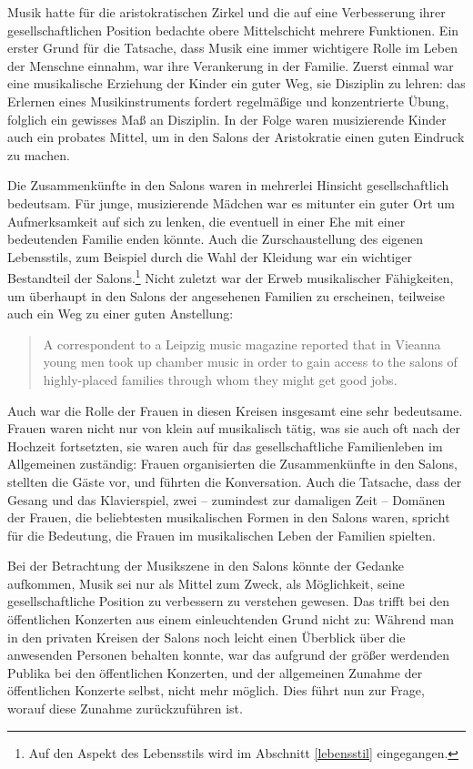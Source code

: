 \documentclass[a4paper, german, oneside]{scrbook}
\begin{document}
Musik hatte für die aristokratischen Zirkel und die auf eine Verbesserung ihrer gesellschaftlichen Position bedachte obere Mittelschicht mehrere Funktionen. Ein erster Grund für die Tatsache, dass Musik eine immer wichtigere Rolle im Leben der Menschne einnahm, war ihre Verankerung in der Familie. Zuerst einmal war eine musikalische Erziehung der Kinder ein guter Weg, sie Disziplin zu lehren: das Erlernen eines Musikinstruments fordert regelmäßige und konzentrierte Übung, folglich ein gewisses Maß an Disziplin. \parencite[vgl.][35ff.]{weber_music_2004} In der Folge waren musizierende Kinder auch ein probates Mittel, um in den Salons der Aristokratie einen guten Eindruck zu machen.

Die Zusammenkünfte in den Salons waren in mehrerlei Hinsicht gesellschaftlich bedeutsam. Für junge, musizierende Mädchen war es mitunter ein guter Ort um Aufmerksamkeit auf sich zu lenken, die eventuell in einer Ehe mit einer bedeutenden Familie enden könnte. Auch die Zurschaustellung des eigenen Lebensstils, zum Beispiel durch die Wahl der Kleidung war ein wichtiger Bestandteil der Salons.\footnote{Auf den Aspekt des Lebensstils wird im Abschnitt \ref{lebensstil} eingegangen.} Nicht zuletzt war der Erweb musikalischer Fähigkeiten, um überhaupt in den Salons der angesehenen Familien zu erscheinen, teilweise auch ein Weg zu einer guten Anstellung: \blockquote[{\cite[37]{weber_music_2004}}]{A correspondent to a Leipzig music magazine reported that in Vieanna young men took up chamber music in order to gain access to the salons of highly-placed families through whom they might get good jobs.}

Auch war die Rolle der Frauen in diesen Kreisen insgesamt eine sehr bedeutsame. Frauen waren nicht nur von klein auf musikalisch tätig, was sie auch oft nach der Hochzeit fortsetzten, sie waren auch für das gesellschaftliche Familienleben im Allgemeinen zuständig: Frauen organisierten die Zusammenkünfte in den Salons, stellten die Gäste vor, und führten die Konversation. Auch die Tatsache, dass der Gesang und das Klavierspiel, zwei -- zumindest zur damaligen Zeit -- Domänen der Frauen, die beliebtesten musikalischen Formen in den Salons waren, spricht für die Bedeutung, die Frauen im musikalischen Leben der Familien spielten. \parencite[vgl.][41]{weber_music_2004}

Bei der Betrachtung der Musikszene in den Salons könnte der Gedanke aufkommen, Musik sei nur als Mittel zum Zweck, als Möglichkeit, seine gesellschaftliche Position zu verbessern zu verstehen gewesen. Das trifft bei den öffentlichen Konzerten aus einem einleuchtenden Grund nicht zu: Während man in den privaten Kreisen der Salons noch leicht einen Überblick über die anwesenden Personen behalten konnte, war das aufgrund der größer werdenden Publika bei den öffentlichen Konzerten, und der allgemeinen Zunahme der öffentlichen Konzerte selbst, nicht mehr möglich. \parencite[vgl.][37]{weber_music_2004} Dies führt nun zur Frage, worauf diese Zunahme zurückzuführen ist. 
\end{document}
